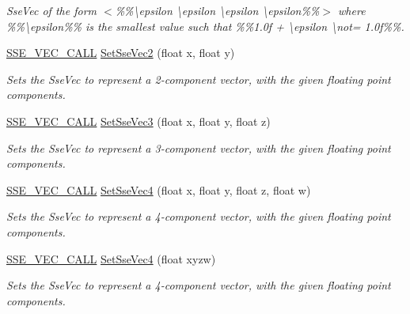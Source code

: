 \begin{DoxyCompactItemize}
\begin{DoxyCompactList}\small\item\em Sse\+Vec of the form $<$\%\%\textbackslash{}epsilon \textbackslash{}epsilon \textbackslash{}epsilon \textbackslash{}epsilon\%\%$>$ where \%\%\textbackslash{}epsilon\%\% is the smallest value such that \%\%1.\+0f + \textbackslash{}epsilon \textbackslash{}not= 1.\+0f\%\%. \end{DoxyCompactList}\item 
\hyperlink{ssevec__math__defs_8h_a97454f977a5281455cecacce1e8ba670}{S\+S\+E\+\_\+\+V\+E\+C\+\_\+\+C\+A\+L\+L} \hyperlink{namespacegfxmath_a9b39fe150660cfec6f39ea5c91e073b5}{Set\+Sse\+Vec2} (float x, float y)
\begin{DoxyCompactList}\small\item\em Sets the Sse\+Vec to represent a 2-\/component vector, with the given floating point components. \end{DoxyCompactList}\item 
\hyperlink{ssevec__math__defs_8h_a97454f977a5281455cecacce1e8ba670}{S\+S\+E\+\_\+\+V\+E\+C\+\_\+\+C\+A\+L\+L} \hyperlink{namespacegfxmath_a81678277edfb7788c4350f27c871f429}{Set\+Sse\+Vec3} (float x, float y, float z)
\begin{DoxyCompactList}\small\item\em Sets the Sse\+Vec to represent a 3-\/component vector, with the given floating point components. \end{DoxyCompactList}\item 
\hyperlink{ssevec__math__defs_8h_a97454f977a5281455cecacce1e8ba670}{S\+S\+E\+\_\+\+V\+E\+C\+\_\+\+C\+A\+L\+L} \hyperlink{namespacegfxmath_a3b21a4362c6ac781c5f6ab922840ba77}{Set\+Sse\+Vec4} (float x, float y, float z, float w)
\begin{DoxyCompactList}\small\item\em Sets the Sse\+Vec to represent a 4-\/component vector, with the given floating point components. \end{DoxyCompactList}\item 
\hyperlink{ssevec__math__defs_8h_a97454f977a5281455cecacce1e8ba670}{S\+S\+E\+\_\+\+V\+E\+C\+\_\+\+C\+A\+L\+L} \hyperlink{namespacegfxmath_a8ceb1c8310eb6cbeec062c9a2d73322e}{Set\+Sse\+Vec4} (float xyzw)
\begin{DoxyCompactList}\small\item\em Sets the Sse\+Vec to represent a 4-\/component vector, with the given floating point components. \end{DoxyCompactList}\item 

\end{DoxyCompactItemize}
